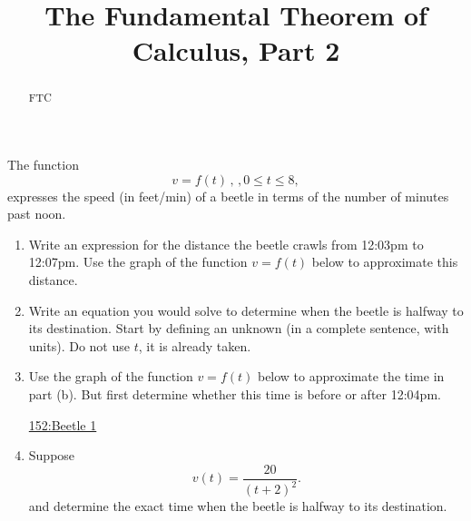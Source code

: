 \documentclass{ximera}
\title{The Fundamental Theorem of Calculus, Part 2}
\begin{document}
\begin{abstract}
FTC
\end{abstract}
\maketitle


\begin{question} \label{QPfeEFVVD}

The function 
\[
 v=f(t) \, , \, , 0 \leq t \leq 8, 
\]
expresses the speed (in feet/min) of a beetle in terms of the number of minutes past noon.

\begin{enumerate}

\item Write an expression for the distance the beetle crawls from 12:03pm to 12:07pm. Use the graph of the function $v=f(t)$ below to approximate this distance.

\item Write an equation you would solve to determine when the beetle is halfway to its destination. Start by defining an unknown (in a complete sentence, with units). Do not use $t$, it is already taken.

\item Use the graph of the function $v=f(t)$ below to approximate the time in part (b). But first determine whether this time is before or after 12:04pm.

\begin{onlineOnly}
    \begin{center}
\end{center}
\end{onlineOnly}

\href{https://www.desmos.com/calculator/gd54bqgk6l}{152:Beetle 1}


\item Suppose 
\[
      v(t) = \frac{20}{(t+2)^2}. 
\] 
and determine the exact time when the beetle is halfway to its destination.



\end{enumerate}

\end{question}
\end{document}
